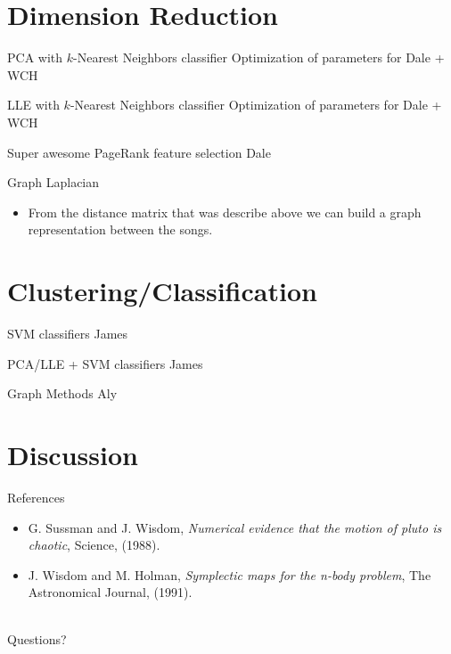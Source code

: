 \documentclass[xcolor=dvipsnames,t]{beamer} %
\begin{document}
\section{Dimension Reduction}
\begin{frame}{PCA with $k$-Nearest Neighbors classifier} %
Optimization of parameters for Dale + WCH
\end{frame}

\begin{frame}{LLE with $k$-Nearest Neighbors classifier}
Optimization of parameters for Dale + WCH
\end{frame}

\begin{frame}{Super awesome PageRank feature selection}
Dale
\end{frame}

\begin{frame}{Graph Laplacian}
\begin{itemize}
\item From the distance matrix that was describe above we can build a graph representation between the songs. 
\end{itemize}
\end{frame}



\section{Clustering/Classification}
\begin{frame}{SVM classifiers}
James
\end{frame}
\begin{frame}{PCA/LLE + SVM classifiers}
James
\end{frame}

\begin{frame}{Graph Methods}
Aly
\end{frame}


\section{Discussion}

\begin{frame}{References}
   \begin{itemize}
      \item G. Sussman and J. Wisdom, \emph{Numerical evidence that the motion of pluto is chaotic}, Science, (1988).\\
      \item J. Wisdom and M. Holman, \emph{Symplectic maps for the n-body problem}, The Astronomical Journal, (1991).\\
   \end{itemize}
   ~\\
   Questions?

\end{frame}
\end{document}
